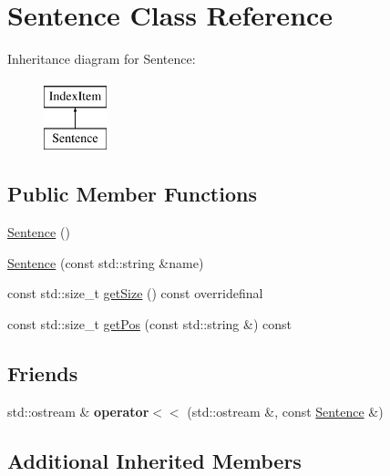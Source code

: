 \hypertarget{classSentence}{\section{Sentence Class Reference}
\label{classSentence}
}
Inheritance diagram for Sentence\-:\begin{figure}[H]
\begin{center}
\leavevmode
\includegraphics[height=2.000000cm]{classSentence}
\end{center}
\end{figure}
\subsection*{Public Member Functions}
\begin{DoxyCompactItemize}
\item 
\hyperlink{classSentence_aa767c3de8aaf7f2e30fa7524cdfcaead}{Sentence} ()
\item 
\hyperlink{classSentence_a92557fe647ad458e02749286b71f2586}{Sentence} (const std\-::string \&name)
\item 
const std\-::size\-\_\-t \hyperlink{classSentence_ab2f0cfb229d1e37012efa18c2f01e745}{get\-Size} () const overridefinal
\item 
const std\-::size\-\_\-t \hyperlink{classSentence_a4bad1bc36e0973235458d1f3aa96c034}{get\-Pos} (const std\-::string \&) const 
\end{DoxyCompactItemize}
\subsection*{Friends}
\begin{DoxyCompactItemize}
\item 
\hypertarget{classSentence_ab4f19f42171de5744a04fed46ecbcc63}{std\-::ostream \& {\bfseries operator$<$$<$} (std\-::ostream \&, const \hyperlink{classSentence}{Sentence} \&)}\label{classSentence_ab4f19f42171de5744a04fed46ecbcc63}

\end{DoxyCompactItemize}
\subsection*{Additional Inherited Members}


